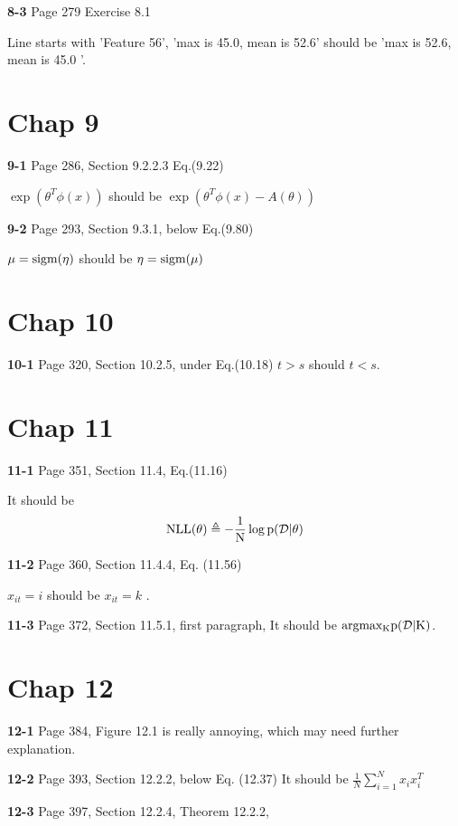 \documentclass[aps,preprint,a4]{revtex4-1}
\newcommand{\nl}{\nonumber \\}
\begin{document}
{\color{red}\textbf{8-3}} Page 279 Exercise 8.1 

Line starts with 'Feature 56', 'max is 45.0, mean is 52.6' should be
'max is 52.6, mean is 45.0 '.



\section{Chap 9}
{\color{red}\textbf{9-1}} Page 286, Section 9.2.2.3 Eq.(9.22)

$\exp{(\theta^{T}\phi(x))}$ should be $\exp{(\theta^{T}\phi(x)-A(\theta))}$

{\color{red}\textbf{9-2}} Page 293, Section 9.3.1, below Eq.(9.80)

$\mu = \rm sigm(\eta)$ should be $\eta = \rm sigm(\mu)$


\section{Chap 10}
{\color{red}\textbf{10-1}} Page 320, Section 10.2.5, under Eq.(10.18)
$t>s$ should $t<s$.

\section{Chap 11}
{\color{red}\textbf{11-1}} Page 351, Section 11.4, Eq.(11.16)

It should be
\begin{equation}
\rm NLL(\theta) \triangleq -\frac{1}{N} \log p(\mathcal D|\theta)\nl
\end{equation}

{\color{red}\textbf{11-2}} Page 360, Section 11.4.4, Eq. (11.56)

$x_{it}=i$ should be $x_{it}=k$ .

{\color{red}\textbf{11-3}} Page 372, Section 11.5.1, first paragraph,
It should be $\rm argmax_{K}p(\mathcal D|K)$.


\section{Chap 12}
{\color{red}\textbf{12-1}} Page 384, Figure 12.1 is really annoying, which may need
further explanation.

{\color{red}\textbf{12-2}} Page 393, Section 12.2.2, below Eq. (12.37)
It should be $\frac{1}{N}\sum_{i=1}^{N}x_{i}x_{i}^{T}$

{\color{red}\textbf{12-3}} Page 397, Section 12.2.4, Theorem 12.2.2,
\end{document}
